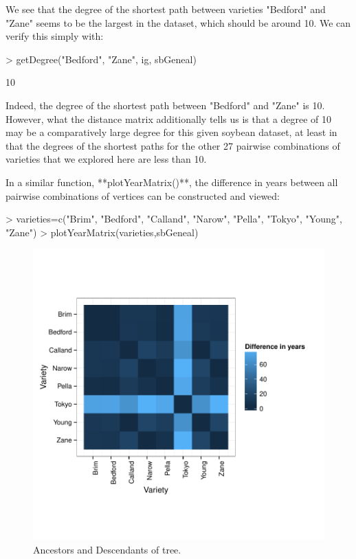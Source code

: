 \documentclass{article}
\numberwithin{equation}{section} %
\begin{document}
We see that the degree of the shortest path between varieties "Bedford" and "Zane" seems to be the largest in the dataset, which should be around 10. We can verify this simply with:

\begin{Schunk}
\begin{Sinput}
> getDegree("Bedford", "Zane", ig, sbGeneal)
\end{Sinput}
\begin{Soutput}
[1] 10
\end{Soutput}
\end{Schunk}

Indeed, the degree of the shortest path between "Bedford" and "Zane" is 10. However, what the distance matrix additionally tells us is that a degree of 10 may be a comparatively large degree for this given soybean dataset, at least in that the degrees of the shortest paths for the other 27 pairwise combinations of varieties that we explored here are less than 10.

In a similar function, **plotYearMatrix()**, the difference in years between all pairwise combinations of vertices can be constructed and viewed:

\begin{Schunk}
\begin{Sinput}
> varieties=c("Brim", "Bedford", "Calland", "Narow", "Pella", "Tokyo", "Young", "Zane")
> plotYearMatrix(varieties,sbGeneal)
\end{Sinput}
\end{Schunk}

\begin{figure} 
  \begin{center} 
\includegraphics{ggenealogy-plotYearMatrix1}
\end{center} 
\caption{Ancestors and Descendants of tree.}
\label{fig:plotYearMatrix1}
\end{figure}
\end{document}
